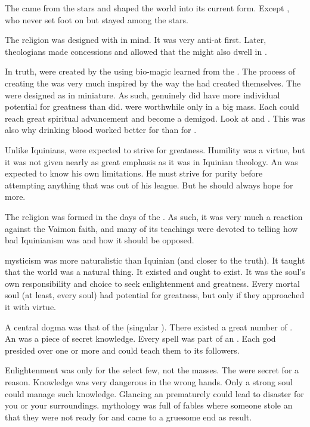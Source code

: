   The \Primordials came from the stars and shaped the world into its current form. 
  Except \Nelxurra, who never set foot on \Miith but stayed among the stars. 
  
  The \rethyax religion was designed with \scathae in mind.
  It was very anti-\human at first. 
  Later, theologians made concessions and allowed that the \Primordials might also dwell in \humans.
  
  In truth, \scathae were created by the \dragons using bio-magic learned from the \xss.
  The process of creating the \scathe was very much inspired by the way the \dragons had created themselves.
  The \scathae were designed as \dragons in miniature.
  As such, \scathae genuinely did have more individual potential for greatness than \humans did.
  \Humans were worthwhile only in a big mass.
  Each \scatha could reach great spiritual advancement and become a demigod.
  Look at \Criseis and \Psyrex. 
  This was also why drinking \draconian blood worked better for \scathae than for \humans. 
  
  Unlike Iquinians, \Ortaicans were expected to strive for greatness. 
  Humility was a virtue, but it was not given nearly as great emphasis as it was in Iquinian theology. 
  An \Ortaican was expected to know his own limitations.
  He must strive for purity before attempting anything that was out of his league.
  But he should always hope for more. 
  
  The \Ortaican religion was formed in the days of the \VaimonCaliphate. 
  As such, it was very much a reaction against the Vaimon faith, and many of its teachings were devoted to telling how bad Iquinianism was and how it should be opposed.
  
  \Ortaican mysticism was more naturalistic than Iquinian (and closer to the truth). 
  It taught that the world was a natural thing. 
  It existed and ought to exist. 
  It was the soul's own responsibility and choice to seek enlightenment and greatness. 
  Every mortal soul (at least, every \scathaese soul) had potential for greatness, but only if they approached it with virtue.
  
  A central dogma was that of the \arcana (singular \arcanum). 
  There existed a great number of \arcana. 
  An \arcanum was a piece of secret knowledge. 
  Every \rethyax spell was part of an \arcanum.
  Each god presided over one or more \arcana and could teach them to its followers. 
  
  Enlightenment was only for the select few, not the masses.
  The \arcana were secret for a reason.
  Knowledge was very dangerous in the wrong hands. 
  Only a strong soul could manage such knowledge. 
  Glancing an \arcanum prematurely could lead to disaster for you or your surroundings. 
  \Ortaican mythology was full of fables where someone stole an \arcanum that they were not ready for and came to a gruesome end as result. 
  
